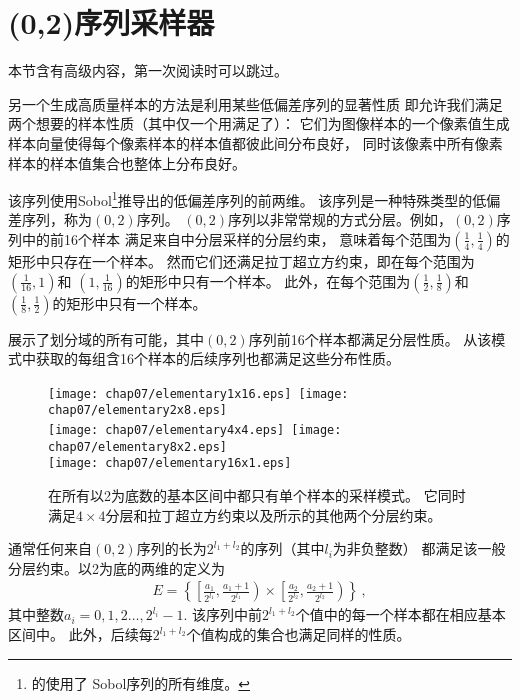 \section{(0,2)序列采样器}\label{sec:(0,2)序列采样器}
\begin{remark}
    本节含有高级内容，第一次阅读时可以跳过。
\end{remark}

另一个生成高质量样本的方法是利用某些低偏差序列的显著性质
即允许我们满足两个想要的样本性质（其中仅一个用满足了）：
它们为图像样本的一个像素值生成样本向量使得每个像素样本的样本值都彼此间分布良好，
同时该像素中所有像素样本的样本值集合也整体上分布良好。

该序列使用Sobol\footnote{\protect{}的使用了
    Sobol序列的所有维度。}推导出的低偏差序列的前两维。
该序列是一种特殊类型的低偏差序列，称为$(0,2)$序列。
$(0,2)$序列以非常常规的方式分层。例如，$(0,2)$序列中的前16个样本
满足来自中分层采样的分层约束，
意味着每个范围为$\displaystyle\left(\frac{1}{4},\frac{1}{4}\right)$的矩形中只存在一个样本。
然而它们还满足拉丁超立方约束，即在每个范围为$\displaystyle\left(\frac{1}{16},1\right)$和
$\displaystyle\left(1,\frac{1}{16}\right)$的矩形中只有一个样本。
此外，在每个范围为$\displaystyle\left(\frac{1}{2},\frac{1}{8}\right)$和
$\displaystyle\left(\frac{1}{8},\frac{1}{2}\right)$的矩形中只有一个样本。

展示了划分域的所有可能，其中$(0,2)$序列前16个样本都满足分层性质。
从该模式中获取的每组含16个样本的后续序列也都满足这些分布性质。
\begin{figure}[htbp]
    \centering
    \texttt{[image: chap07/elementary1x16.eps]}\,
    \texttt{[image: chap07/elementary2x8.eps]}\\
    \texttt{[image: chap07/elementary4x4.eps]}\,
    \texttt{[image: chap07/elementary8x2.eps]}\\
    \texttt{[image: chap07/elementary16x1.eps]}
    \caption{在所有以2为底数的基本区间中都只有单个样本的采样模式。
        它同时满足$4\times4$分层和拉丁超立方约束以及所示的其他两个分层约束。}
    \label{fig:7.28}
\end{figure}

通常任何来自$(0,2)$序列的长为$2^{l_1+l_2}$的序列（其中$l_i$为非负整数）
都满足该一般分层约束。以2为底的两维的定义为
\begin{align*}
    E=\left\{\left[\frac{a_1}{2^{l_1}},\frac{a_1+1}{2^{l_1}}\right)\times\left[\frac{a_2}{2^{l_2}},\frac{a_2+1}{2^{l_2}}\right)\right\}\, ,
\end{align*}
其中整数$a_i=0,1,2\ldots,2^{l_i}-1$.
该序列中前$2^{l_1+l_2}$个值中的每一个样本都在相应基本区间中。
此外，后续每$2^{l_1+l_2}$个值构成的集合也满足同样的性质。

